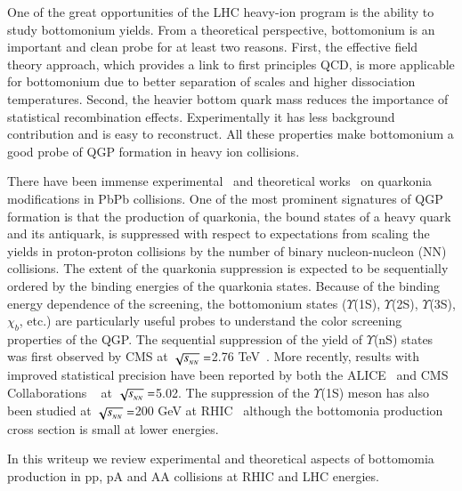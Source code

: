 One of the great opportunities of the 
LHC heavy-ion program is the ability to study bottomonium yields. 
From a theoretical perspective, bottomonium is an important and clean probe 
for at least two reasons. 
First, the effective field theory approach, which provides a link to first 
principles QCD, is more applicable for bottomonium due to better separation of 
scales and higher dissociation temperatures. Second, the heavier bottom quark 
mass reduces the importance of statistical recombination effects.
Experimentally it has less background contribution and is easy to reconstruct. 
All these properties make bottomonium a good probe of 
QGP formation in heavy ion collisions.


There have been immense experimental~\cite{Sirunyan:2017isk,Sirunyan:2017lzi,Sirunyan:2018nsz,Acharya:2019iur,Acharya:2018mni}
and theoretical works~\cite{Strickland:2011mw,Song:2011nu,Kumar:2014kfa,Kumar:2019xdj} on
quarkonia modifications in PbPb collisions.
One of the most prominent signatures of QGP
formation is that the production of quarkonia, the bound states of a heavy quark and its antiquark,
is suppressed with respect to expectations from scaling the yields in proton-proton collisions
by the number of binary nucleon-nucleon
(NN) collisions.
 The extent of the quarkonia suppression is
expected to be sequentially ordered by the binding energies of the quarkonia states. Because of
the binding energy
dependence of the screening, the bottomonium states ($\Upsilon$(1S), $\Upsilon$(2S),
$\Upsilon$(3S), $\chi_{b}$, etc.) are particularly useful probes to understand the color screening
properties 
of the QGP. The sequential suppression of the yield of $\Upsilon$(nS) states was first observed by
CMS at $\sqrt{s_{_{NN}}} =$2.76 TeV~\cite{Chatrchyan:2011pe,Chatrchyan:2012lxa}. More recently, results with improved
statistical precision have been reported by both the ALICE~\cite{ALICE:2018wzm}
and CMS Collaborations ~\cite{Sirunyan:2017lzi,Sirunyan:2018nsz} at $\sqrt{s_{_{NN}}} =$5.02.
The suppression of the $\Upsilon$(1S)
meson has also been studied at $\sqrt{s_{_{NN}}} =$200 GeV at RHIC~\cite{STAR:2013kwk} although the
bottomonia production cross section is small at lower energies. 

In this writeup we review experimental and theoretical aspects of bottomomia production in pp, pA
and AA collisions at RHIC and LHC energies.







